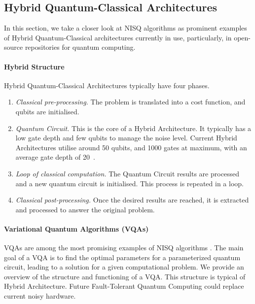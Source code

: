 \subsection{Hybrid Quantum-Classical Architectures}
In this section, we take a closer look at NISQ algorithms as prominent examples of Hybrid Quantum-Classical architectures currently in use, particularly, in open-source repositories for quantum computing. 

\paragraph{Hybrid Structure}
Hybrid Quantum-Classical Architectures typically have four phases. %

\begin{enumerate}\itemsep0em

\item  \textit{Classical pre-processing.} The problem is translated into a cost function, and qubits are initialised.
\item  \textit{Quantum Circuit.} This is the core of a Hybrid Architecture. It typically has a low gate depth and few qubits to manage the noise level. Current Hybrid Architectures utilise around 50 qubits, and 1000 gates at maximum, with an average gate depth of 20~\cite{lau_nisq_2022}.
\item  \textit{Loop of classical computation.} The Quantum Circuit results are processed and a new quantum circuit is initialised. This process is repeated in a loop.
\item  \textit{Classical post-processing.} Once the desired results are reached, it is extracted and processed to answer the original problem.

\end{enumerate}



\paragraph{Variational Quantum Algorithms (VQAs)}
\label{vqa seq}
VQAs are among the most promising examples of NISQ algorithms \cite{tilly_variational_2022}. 
The main goal of a VQA is to find the optimal parameters for a parameterized quantum circuit, leading to a solution for a given computational problem. We provide an overview of the structure and functioning of a VQA. This structure is typical of Hybrid Architecture. Future Fault-Tolerant Quantum Computing could replace current noisy hardware.


